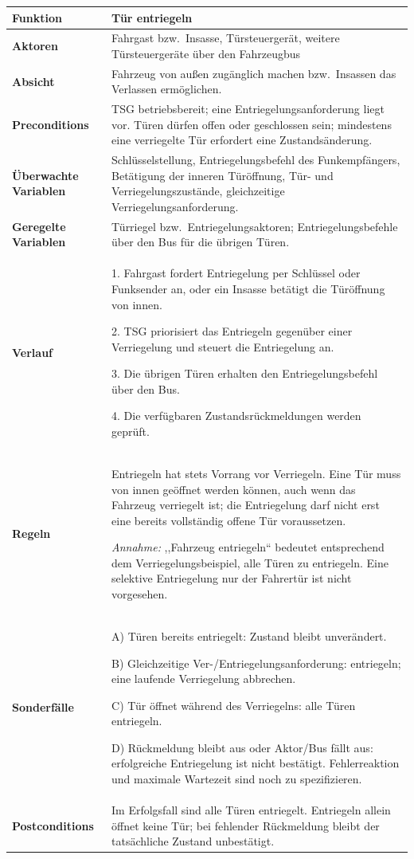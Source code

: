 \begin{loesung}
\begingroup
\small
\renewcommand{\arraystretch}{1.15}
\begin{tabularx}{\linewidth}{|p{3.3cm}|X|}
\hline
\textbf{Funktion} & \textbf{Tür entriegeln} \\ \hline
\textbf{Aktoren} & Fahrgast bzw.\ Insasse, Türsteuergerät, weitere Türsteuergeräte über den Fahrzeugbus \\ \hline
\textbf{Absicht} & Fahrzeug von außen zugänglich machen bzw.\ Insassen das Verlassen ermöglichen. \\ \hline
\textbf{Preconditions} & TSG betriebsbereit; eine Entriegelungsanforderung liegt vor. Türen dürfen offen oder geschlossen sein; mindestens eine verriegelte Tür erfordert eine Zustandsänderung. \\ \hline
\textbf{Überwachte Variablen} & Schlüsselstellung, Entriegelungsbefehl des Funkempfängers, Betätigung der inneren Türöffnung, Tür- und Verriegelungszustände, gleichzeitige Verriegelungsanforderung. \\ \hline
\textbf{Geregelte Variablen} & Türriegel bzw.\ Entriegelungsaktoren; Entriegelungsbefehle über den Bus für die übrigen Türen. \\ \hline
\textbf{Verlauf} &
1. Fahrgast fordert Entriegelung per Schlüssel oder Funksender an, oder ein Insasse betätigt die Türöffnung von innen.
\par 2. TSG priorisiert das Entriegeln gegenüber einer Verriegelung und steuert die Entriegelung an.
\par 3. Die übrigen Türen erhalten den Entriegelungsbefehl über den Bus.
\par 4. Die verfügbaren Zustandsrückmeldungen werden geprüft. \\ \hline
\textbf{Regeln} &
Entriegeln hat stets Vorrang vor Verriegeln. Eine Tür muss von innen geöffnet werden können, auch wenn das Fahrzeug verriegelt ist; die Entriegelung darf nicht erst eine bereits vollständig offene Tür voraussetzen.
\par \emph{Annahme:} ,,Fahrzeug entriegeln`` bedeutet entsprechend dem Verriegelungsbeispiel, alle Türen zu entriegeln. Eine selektive Entriegelung nur der Fahrertür ist nicht vorgesehen. \\ \hline
\textbf{Sonderfälle} &
A) Türen bereits entriegelt: Zustand bleibt unverändert.
\par B) Gleichzeitige Ver-/Entriegelungsanforderung: entriegeln; eine laufende Verriegelung abbrechen.
\par C) Tür öffnet während des Verriegelns: alle Türen entriegeln.
\par D) Rückmeldung bleibt aus oder Aktor/Bus fällt aus: erfolgreiche Entriegelung ist nicht bestätigt. Fehlerreaktion und maximale Wartezeit sind noch zu spezifizieren. \\ \hline
\textbf{Postconditions} & Im Erfolgsfall sind alle Türen entriegelt. Entriegeln allein öffnet keine Tür; bei fehlender Rückmeldung bleibt der tatsächliche Zustand unbestätigt. \\ \hline
\end{tabularx}
\endgroup


\end{loesung}

